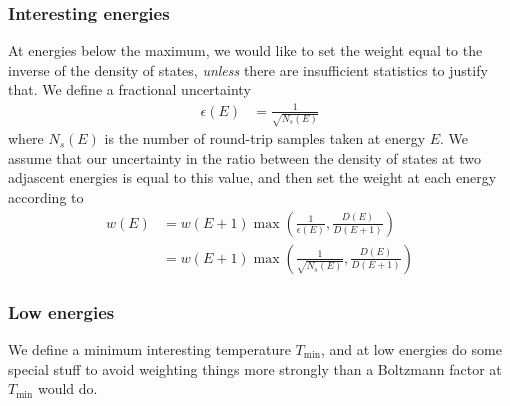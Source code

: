 \documentclass[letterpaper,twocolumn,amsmath,amssymb,pre,aps,10pt]{revtex4-1}
\begin{document}
\subsubsection{Interesting energies}
At energies below the maximum, we would like to set the weight equal
to the inverse of the density of states, \emph{unless} there are
insufficient statistics to justify that.  We define a fractional
uncertainty
\begin{align}
  \epsilon(E) &= \frac{1}{\sqrt{N_s(E)}}
\end{align}
where $N_s(E)$ is the number of round-trip samples taken at energy
$E$.  We assume that our uncertainty in the ratio between the density
of states at two adjascent energies is equal to this value, and then
set the weight at each energy according to
\begin{align}
  w(E) &= w(E+1)\max\left(\frac1{\epsilon(E)},
  \frac{D(E)}{D(E+1)}\right)
  \\
   &= w(E+1)\max\left(\frac1{\sqrt{N_s(E)}},
  \frac{D(E)}{D(E+1)}\right)
\end{align}

\subsubsection{Low energies}
We define a minimum interesting temperature $T_{\min}$, and at low
energies do some special stuff to avoid weighting things more
strongly than a Boltzmann factor at $T_{\min}$ would do.



\end{document}
